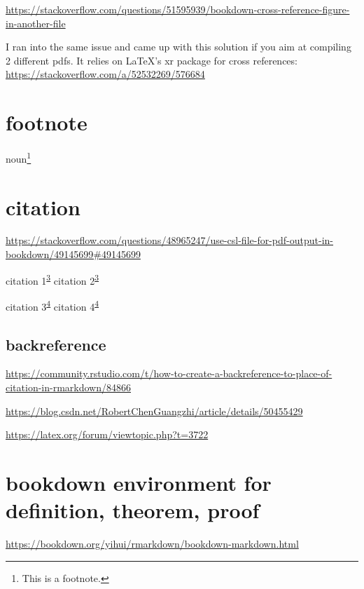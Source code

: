 \documentclass[
]{book}
\theoremstyle{definition}
\theoremstyle{definition}
\theoremstyle{definition}
\theoremstyle{definition}
\theoremstyle{remark}
\begin{document}
\url{https://stackoverflow.com/questions/51595939/bookdown-cross-reference-figure-in-another-file}

I ran into the same issue and came up with this solution if you aim at compiling 2 different pdfs. It relies on LaTeX's xr package for cross references: \url{https://stackoverflow.com/a/52532269/576684}

\hypertarget{footnote-1}{%
\section{footnote}\label{footnote-1}}

noun\footnote{This is a footnote.}

\hypertarget{citation}{%
\section{citation}\label{citation}}

\url{https://stackoverflow.com/questions/48965247/use-csl-file-for-pdf-output-in-bookdown/49145699\#49145699}

citation 1\textsuperscript{\protect\hyperlink{ref-noauthor_bookdown_2019}{3}} citation 2\textsuperscript{\protect\hyperlink{ref-noauthor_bookdown_2019}{3}}

citation 3\textsuperscript{\protect\hyperlink{ref-ccjou2009}{4}} citation 4\textsuperscript{\protect\hyperlink{ref-ccjou2009}{4}}

\hypertarget{backreference}{%
\subsection{backreference}\label{backreference}}

\url{https://community.rstudio.com/t/how-to-create-a-backreference-to-place-of-citation-in-rmarkdown/84866}

\url{https://blog.csdn.net/RobertChenGuangzhi/article/details/50455429}

\url{https://latex.org/forum/viewtopic.php?t=3722}

\hypertarget{bookdown-environment-for-definition-theorem-proof}{%
\section{bookdown environment for definition, theorem, proof}\label{bookdown-environment-for-definition-theorem-proof}}

\url{https://bookdown.org/yihui/rmarkdown/bookdown-markdown.html}
\end{document}

